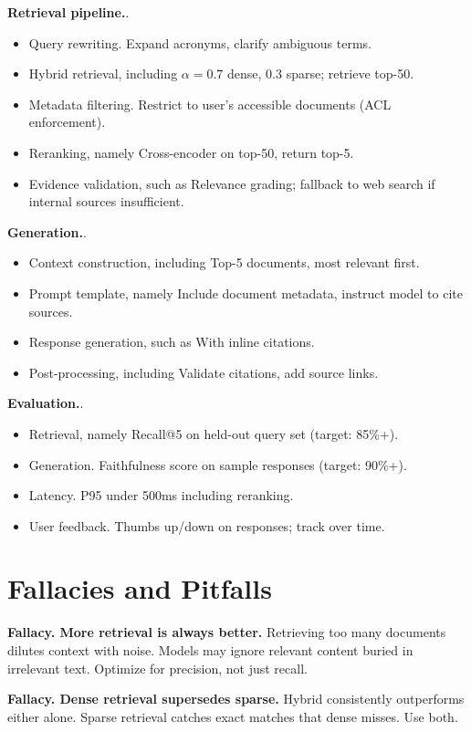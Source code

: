 \textbf{Retrieval pipeline.}.
\begin{itemize}
\item Query rewriting. Expand acronyms, clarify ambiguous terms.
\item Hybrid retrieval, including $\alpha = 0.7$ dense, $0.3$ sparse; retrieve top-50.
\item Metadata filtering. Restrict to user's accessible documents (ACL enforcement).
\item Reranking, namely Cross-encoder on top-50, return top-5.
\item Evidence validation, such as Relevance grading; fallback to web search if internal sources insufficient.
\end{itemize}

\textbf{Generation.}.
\begin{itemize}
\item Context construction, including Top-5 documents, most relevant first.
\item Prompt template, namely Include document metadata, instruct model to cite sources.
\item Response generation, such as With inline citations.
\item Post-processing, including Validate citations, add source links.
\end{itemize}

\textbf{Evaluation.}.
\begin{itemize}
\item Retrieval, namely Recall@5 on held-out query set (target: 85\%+).
\item Generation. Faithfulness score on sample responses (target: 90\%+).
\item Latency. P95 under 500ms including reranking.
\item User feedback. Thumbs up/down on responses; track over time.
\end{itemize}

\section{Fallacies and Pitfalls}

\textbf{Fallacy. More retrieval is always better.} Retrieving too many documents dilutes context with noise. Models may ignore relevant content buried in irrelevant text. Optimize for precision, not just recall.

\textbf{Fallacy. Dense retrieval supersedes sparse.} Hybrid consistently outperforms either alone. Sparse retrieval catches exact matches that dense misses. Use both.

